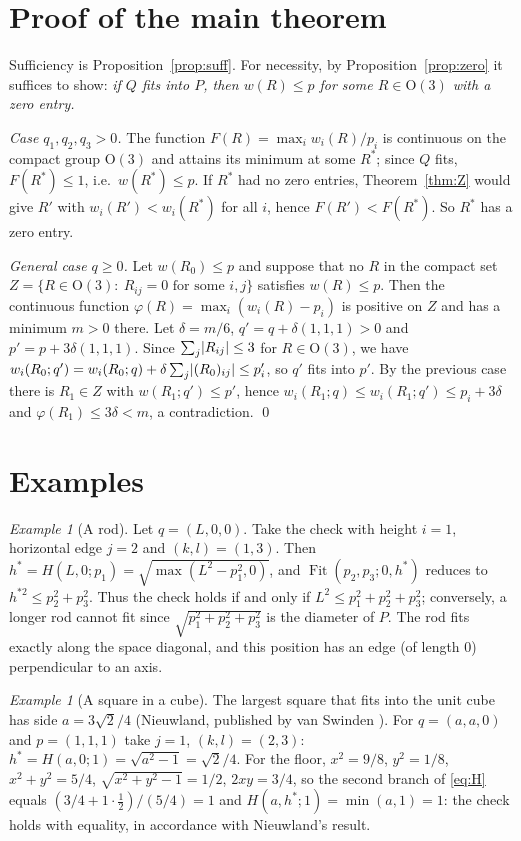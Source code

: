 \documentclass[11pt]{article}
\theoremstyle{definition}
\theoremstyle{remark}
\newtheorem{example}[theorem]{Example}
\newcommand{\Ort}{\mathrm{O}(3)}
\newcommand{\Fit}{\operatorname{Fit}}
\DeclarePairedDelimiter{\abs}{\lvert}{\rvert}
\begin{document}
\section{Proof of the main theorem}\label{sec:proof}

Sufficiency is Proposition~\ref{prop:suff}. For necessity, by Proposition~\ref{prop:zero} it suffices
to show: \emph{if $Q$ fits into $P$, then $w(R)\le p$ for some $R\in\Ort$ with a zero entry.}

\emph{Case $q_1,q_2,q_3>0$.} The function $F(R)=\max_iw_i(R)/p_i$ is continuous on the compact group
$\Ort$ and attains its minimum at some $R^*$; since $Q$ fits, $F(R^*)\le1$, i.e.\ $w(R^*)\le p$. If
$R^*$ had no zero entries, Theorem~\ref{thm:Z} would give $R'$ with $w_i(R')<w_i(R^*)$ for all $i$,
hence $F(R')<F(R^*)$. So $R^*$ has a zero entry.

\emph{General case $q\ge0$.} Let $w(R_0)\le p$ and suppose that no $R$ in the compact set
$Z=\{R\in\Ort:\ R_{ij}=0\text{ for some }i,j\}$ satisfies $w(R)\le p$. Then the continuous function
$\varphi(R)=\max_i(w_i(R)-p_i)$ is positive on $Z$ and has a minimum $m>0$ there. Let $\delta=m/6$,
$q'=q+\delta(1,1,1)>0$ and $p'=p+3\delta(1,1,1)$. Since $\sum_j\abs{R_{ij}}\le3$ for $R\in\Ort$, we
have $w_i(R_0;q')=w_i(R_0;q)+\delta\sum_j\abs{(R_0)_{ij}}\le p_i'$, so $q'$ fits into $p'$. By the
previous case there is $R_1\in Z$ with $w(R_1;q')\le p'$, hence $w_i(R_1;q)\le w_i(R_1;q')\le p_i+3\delta$
and $\varphi(R_1)\le3\delta<m$, a contradiction. \qed

\section{Examples}\label{sec:examples}

\begin{example}[A rod]
Let $q=(L,0,0)$. Take the check with height $i=1$, horizontal edge $j=2$ and $(k,l)=(1,3)$. Then
$h^*=H(L,0;p_1)=\sqrt{\max(L^2-p_1^2,0)}$, and $\Fit(p_2,p_3;0,h^*)$ reduces to $h^{*2}\le p_2^2+p_3^2$.
Thus the check holds if and only if $L^2\le p_1^2+p_2^2+p_3^2$; conversely, a longer rod cannot fit
since $\sqrt{p_1^2+p_2^2+p_3^2}$ is the diameter of $P$. The rod fits exactly along the space
diagonal, and this position has an edge (of length $0$) perpendicular to an axis.
\end{example}

\begin{example}[A square in a cube]
The largest square that fits into the unit cube has side $a=3\sqrt2/4$ (Nieuwland, published by van Swinden
\cite{vanSwinden1816}). For $q=(a,a,0)$ and $p=(1,1,1)$ take $j=1$, $(k,l)=(2,3)$: $h^*=H(a,0;1)=
\sqrt{a^2-1}=\sqrt2/4$. For the floor, $x^2=9/8$, $y^2=1/8$, $x^2+y^2=5/4$, $\sqrt{x^2+y^2-1}=1/2$,
$2xy=3/4$, so the second branch of \eqref{eq:H} equals $(3/4+1\cdot\tfrac12)/(5/4)=1$ and
$H(a,h^*;1)=\min(a,1)=1$: the check holds with equality, in accordance with Nieuwland's result.
\end{example}
\end{document}
